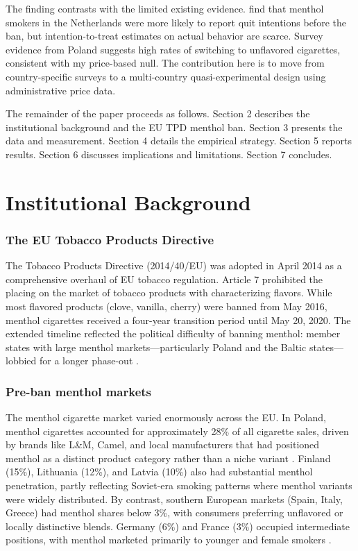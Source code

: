 \documentclass[12pt]{article}
\begin{document}
The finding contrasts with the limited existing evidence. \citet{chung2020menthol} find that menthol smokers in the Netherlands were more likely to report quit intentions before the ban, but intention-to-treat estimates on actual behavior are scarce. Survey evidence from Poland \citep{zatonski2021menthol} suggests high rates of switching to unflavored cigarettes, consistent with my price-based null. The contribution here is to move from country-specific surveys to a multi-country quasi-experimental design using administrative price data.

The remainder of the paper proceeds as follows. Section 2 describes the institutional background and the EU TPD menthol ban. Section 3 presents the data and measurement. Section 4 details the empirical strategy. Section 5 reports results. Section 6 discusses implications and limitations. Section 7 concludes.


\section{Institutional Background}

\subsubsection*{The EU Tobacco Products Directive} The Tobacco Products Directive (2014/40/EU) was adopted in April 2014 as a comprehensive overhaul of EU tobacco regulation. Article 7 prohibited the placing on the market of tobacco products with characterizing flavors. While most flavored products (clove, vanilla, cherry) were banned from May 2016, menthol cigarettes received a four-year transition period until May 20, 2020. The extended timeline reflected the political difficulty of banning menthol: member states with large menthol markets---particularly Poland and the Baltic states---lobbied for a longer phase-out \citep{european2014directive}.

\subsubsection*{Pre-ban menthol markets} The menthol cigarette market varied enormously across the EU. In Poland, menthol cigarettes accounted for approximately 28\% of all cigarette sales, driven by brands like L\&M, Camel, and local manufacturers that had positioned menthol as a distinct product category rather than a niche variant \citep{zatonski2021menthol}. Finland (15\%), Lithuania (12\%), and Latvia (10\%) also had substantial menthol penetration, partly reflecting Soviet-era smoking patterns where menthol variants were widely distributed. By contrast, southern European markets (Spain, Italy, Greece) had menthol shares below 3\%, with consumers preferring unflavored or locally distinctive blends. Germany (6\%) and France (3\%) occupied intermediate positions, with menthol marketed primarily to younger and female smokers \citep{laverty2018menthol}.
\end{document}
